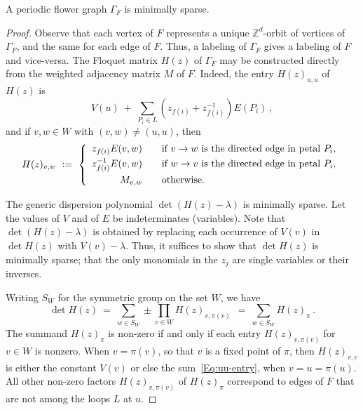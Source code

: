 \documentclass[10pt,a4paper]{amsart}
\newcommand{\ZZ}{{\mathbb Z}}
\begin{document}
\begin{Theorem}\label{Th:FlowerGraphs}
  A periodic flower graph $\Gamma_F$ is minimally sparse.
\end{Theorem}

\begin{proof}
  Observe that each vertex of $F$ represents a unique $\ZZ^d$-orbit of vertices of $\Gamma_F$, and the same for each
  edge of $F$. 
  Thus, a labeling of $\Gamma_F$ gives a labeling of $F$ and vice-versa.
  The Floquet matrix $H(z)$ of $\Gamma_F$ may be constructed directly
  from the weighted adjacency matrix $M$ of $F$.
  Indeed, the entry $H(z)_{u,u}$ of $H(z)$ is
  \begin{equation}\label{Eq:uu-entry}
     V(u)\ +\ \sum_{P_i\in L} \left(z_{f(i)}+z_{f(i)}^{-1}\right)E(P_i)\,,
  \end{equation}
  and if $v,w\in W$ with $(v,w)\neq (u,u)$, then 
  \begin{equation}\label{Eq:H_Defn}
    H(z)_{v,w}\ \vcentcolon=\ \left\{
    \begin{array}{rcl}
      z_{f(i)}E(v,w)&&\mbox{if } v\to w\mbox{ is the directed edge in petal }P_i,\vspace{3pt}\\
      z_{f(i)}^{-1}E(v,w)&&\mbox{if } w\to v\mbox{ is the directed edge in petal }P_i,\vspace{3pt}\\
      M_{v,w}&&\mbox{otherwise.}
    \end{array}\right.
  \end{equation}

  The generic dispersion polynomial $\det(H(z){-}\lambda)$ is minimally sparse.
  Let the values of $V$ and of $E$ be indeterminates (variables).
  Note that $\det(H(z){-}\lambda)$  is obtained  by replacing each occurrence of $V(v)$ in $\det H(z)$ with $V(v){-}\lambda$.
  Thus, it suffices to show that $\det H(z)$ is minimally sparse; that the only monomials in the $z_j$ are
  single variables or their inverses.

  Writing $S_W$ for the symmetric group on the set $W$, we have
  \[
     \det H(z)\ =\ \sum_{w\in S_W} \pm \prod_{v\in W} H(z)_{v,\pi(v)}
      \ \ =\ \sum_{w\in S_W}  H(z)_\pi\,.
  \]
  The summand $H(z)_\pi$ is non-zero if and only if each entry $H(z)_{v,\pi(v)}$ for $v\in W$ is nonzero.
  When $v=\pi(v)$, so that $v$ is a fixed point of $\pi$, then $H(z)_{v,v}$ is either the constant $V(v)$ or
  else the sum~\eqref{Eq:uu-entry}, when $v=u=\pi(u)$.
  All other non-zero factors $H(z)_{v,\pi(v)}$ of $H(z)_\pi$ correspond to edges of $F$ that are not among the loops
  $L$ at $u$. 


\end{proof}
\end{document}
